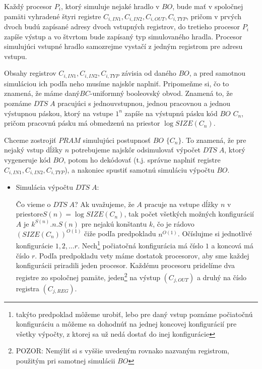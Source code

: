 \begin{dokaz}
  Každý procesor $P_i$, ktorý simuluje nejaké hradlo v $BO$, bude
  mať v spoločnej pamäti vyhradené štyri registre $C_{i,IN1},
  C_{i,IN2}, C_{i,OUT} ,C_{i,TYP}$, pričom v prvých dvoch budú
  zapísané adresy dvoch vstupných registrov, do tretieho procesor
  $P_i$ zapíše výstup a vo štvrtom bude zapísaný typ simulovaného
  hradla. Procesor simulujúci vstupné hradlo samozrejme vystačí z
  jedným registrom pre adresu vstupu.

  Obsahy registrov $C_{i,IN1}, C_{i,IN2}, C_{i,TYP}$ závisia od
  daného $BO$, a pred samotnou simuláciou ich podľa neho musíme
  najskôr naplniť. Pripomeňme si, čo to znamená, že máme
  daný\linebreak $BC$-uniformný booleovský obvod. Znamená to, že
  poznáme $DTS\; A$ pracujúci s jednou\linebreak vstupnou, jednou
  pracovnou a jednou výstupnou páskou, ktorý na vstupe $1^n$ zapíše
  na výstupnú pásku kód $BO$ $C_n$, pričom pracovnú pásku má
  obmedzenú na priestor $\log SIZE(C_n)$.

  Chceme zostrojiť $PRAM$ simulujúci postupnosť $BO$ $\{ C_n\}$. To
  znamená, že pre nejaký vstup dĺžky $n$ potrebujeme najskôr
  odsimulovať výpočet $DTS\; A$, ktorý vygeneruje kód $BO$, potom ho
  dekódovať (t.j. správne naplniť registre $C_{i,IN1}, C_{i,IN2},
  C_{i,TYP}$), a nakoniec spustiť samotnú simuláciu výpočtu $BO$.

  \pagebreak

  \begin{itemize}
    \item Simulácia výpočtu $DTS\; A$:

    Čo vieme o $DTS\; A$? Ak uvažujeme, že $A$ pracuje na vstupe
    dĺžky $n$ v priestore\linebreak $S(n)=\log SIZE(C_n)$, tak počet všetkých
    možných konfigurácií $A$ je $k^{S(n)}.n.S(n)$ pre nejakú
    konštantu $k$, čo je rádovo $(SIZE(C_n))^{O(1)}$ čiže podľa
    predpokladu $n^{O(1)}$. Očíslujme si jednotlivé konfigurácie
    $1,2,\dots r$. Nech\footnote{takýto predpoklad môžeme urobiť,
    lebo pre daný vstup poznáme počiatočnú konfiguráciu a môžeme sa
    dohodnúť na jednej koncovej konfigurácií pre všetky výpočty, z
    ktorej sa už nedá dostať do inej konfigurácie} počiatočná
    konfigurácia má číslo $1$ a koncová má číslo $r$. Podľa
    predpokladu vety máme dostatok procesorov, aby sme každej
    konfigurácii priradili jeden procesor. Každému procesoru
    pridelíme dva registre zo spoločnej pamäte, jeden\footnote{POZOR:
    Nemýliť si s vyššie uvedeným rovnako nazvaným registrom,
    použitým pri samotnej simulácii $BO$} na výstup $(C_{j,OUT})$
    a druhý na číslo registra $(C_{j,REG})$.


\end{itemize}
\end{dokaz}
